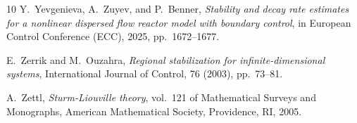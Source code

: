 \documentclass{mpi2015-cscpreprint}
\numberwithin{equation}{section}
\begin{document}
\begin{thebibliography}{10}
{Y.~Yevgenieva, A.~Zuyev, and P.~Benner}, {\em Stability and decay rate
  estimates for a nonlinear dispersed flow reactor model with boundary
  control}, in European Control Conference (ECC), 2025, pp.~1672--1677.

{E.~Zerrik and M.~Ouzahra}, {\em Regional stabilization for
  infinite-dimensional systems}, International Journal of Control, 76 (2003),
  pp.~73--81.

{A.~Zettl}, {\em Sturm-{L}iouville theory}, vol.~121 of Mathematical
  Surveys and Monographs, American Mathematical Society, Providence, RI, 2005.

\end{thebibliography}

 
\end{document}
